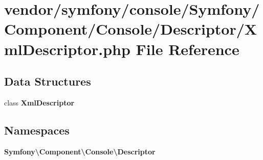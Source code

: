\section{vendor/symfony/console/\+Symfony/\+Component/\+Console/\+Descriptor/\+Xml\+Descriptor.php File Reference}
\label{_xml_descriptor_8php}
\subsection*{Data Structures}
\begin{DoxyCompactItemize}
\item 
class {\bf Xml\+Descriptor}
\end{DoxyCompactItemize}
\subsection*{Namespaces}
\begin{DoxyCompactItemize}
\item 
 {\bf Symfony\textbackslash{}\+Component\textbackslash{}\+Console\textbackslash{}\+Descriptor}
\end{DoxyCompactItemize}
